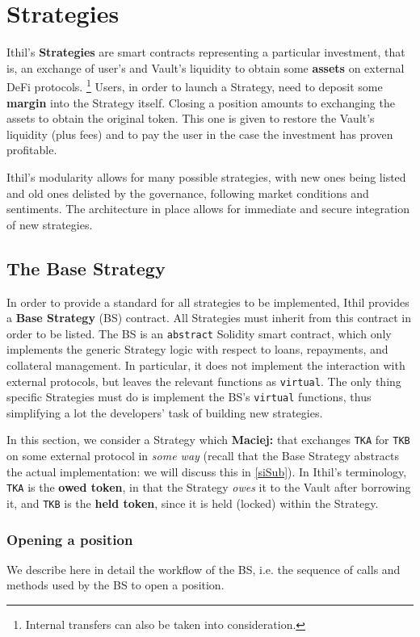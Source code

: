 \documentclass[a4paper,10 pt]{article}
\newcommand{\mz}[1]{\noindent \textcolor{NavyBlue}{\textbf{Maciej:}  #1}}
\theoremstyle{definition}
\begin{document}
\section{Strategies}\label{stratSec}

Ithil's {\bf Strategies} are smart contracts representing a particular investment, that is, an exchange of user's and Vault's liquidity to obtain some {\bf assets} on external DeFi protocols. \footnote{Internal transfers can also be taken into consideration.} Users, in order to launch a Strategy, need to deposit some {\bf margin} into the Strategy itself. Closing a position amounts to exchanging the assets to obtain the original token. This one is given to restore the Vault's liquidity (plus fees) and to pay the user in the case the investment has proven profitable. 

Ithil's modularity allows for many possible strategies, with new ones being listed and old ones delisted by the governance, following market conditions and sentiments. The architecture in place allows for immediate and secure integration of new strategies.

\subsection{The Base Strategy}\label{asSub}

In order to provide a standard for all strategies to be implemented, Ithil provides a {\bf Base Strategy} (BS) contract. All Strategies must inherit from this contract in order to be listed. The BS is an \verb|abstract| Solidity smart contract, which only implements the generic Strategy logic with respect to loans, repayments, and collateral management. In particular, it does not implement the interaction with external protocols, but leaves the relevant functions as \verb|virtual|. The only thing specific Strategies must do is implement the BS's \verb|virtual| functions, thus simplifying a lot the developers' task of building new strategies.

 In this section, we consider a Strategy which \mz{that} exchanges \verb|TKA| for \verb|TKB| on some external protocol in {\it some way} (recall that the Base Strategy abstracts the actual implementation: we will discuss this in \ref{siSub}). In Ithil's terminology, \verb|TKA| is the {\bf owed token}, in that the Strategy {\it owes} it to the Vault after borrowing it, and \verb|TKB| is the {\bf held token}, since it is held (locked) within the Strategy.

\subsubsection{Opening a position}\label{opSubSub}
We describe here in detail the workflow of the BS, i.e. the sequence of calls and methods used by the BS to open a position.
\end{document}

